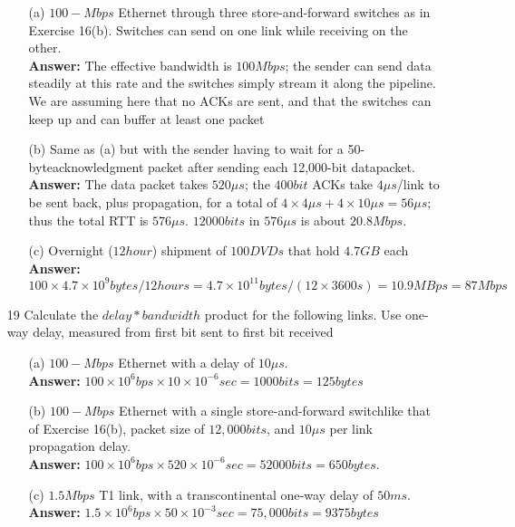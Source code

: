 \documentclass[a4paper]{article}
\begin{document}
\begin{itemize}
	      \begin{itemize}
	      	\item[(a)] $100-Mbps$ Ethernet through three store-and-forward switches as in Exercise 16(b). Switches can send on one link while receiving on the other. \\
	      	      \textbf{Answer:} The effective bandwidth is $100 Mbps$; the sender can send data steadily at this rate and the switches simply stream it along the pipeline. We are assuming here that no ACKs are sent, and that the switches can keep up and can buffer at least one packet 
	      	\item[(b)] Same as (a) but with the sender having to wait for a 50-byteacknowledgment packet after sending each 12,000-bit datapacket. \\
	      	      \textbf{Answer:} The data packet takes $520 \mu s$; the $400 bit$ ACKs take $4 \mu s$/link to be sent back, plus propagation, for a total of $4 \times 4 \mu s + 4 \times 10 \mu s = 56 \mu s$; thus the total RTT is $576 \mu s$. $12000 bits$ in $576\mu s$ is about $20.8 Mbps$. 
	      	\item[(c)] Overnight ($12 hour$) shipment of $100 DVDs$ that hold $4.7 GB$ each \\
	      	      \textbf{Answer:} $100 \times 4.7 \times 10^9 bytes / 12 hours = 4.7 \times 10^11 bytes/(12 \times 3600 s) = 10.9 MBps = 87 Mbps$ 
	      \end{itemize} 
	\item[19] Calculate the $delay * bandwidth$ product for the following links. Use one-way delay, measured from first bit sent to first bit received
	      \begin{itemize}
	      	\item[(a)] $100-Mbps$ Ethernet with a delay of $10\mu s$. \\
	      	      \textbf{Answer:} $100 \times 10^6bps \times 10 \times 10^{-6} sec = 1000 bits = 125 bytes$ 
	      	\item[(b)] $100-Mbps$ Ethernet with a single store-and-forward switchlike that of Exercise 16(b), packet size of $12,000 bits$, and $10\mu s$ per link propagation delay. \\
	      	      \textbf{Answer:} $100 \times 10^6bps \times 520 \times 10^{-6} sec = 52000 bits = 650 bytes$. 
	      	\item[(c)] $1.5 Mbps$ T1 link, with a transcontinental one-way delay of $50ms$. \\
	      	      \textbf{Answer:} $1.5 \times 10^6 bps \times 50 \times 10^{-3} sec = 75,000 bits = 9375 bytes$ 

\end{itemize}
\end{itemize}
\end{document}
